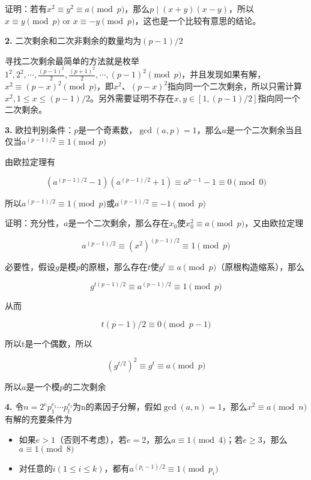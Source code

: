 \documentclass{article}
\begin{document}
证明：若有$x^2\equiv y^2\equiv a\pmod{p}$，那么$p\mid (x+y)(x-y)$，所以$x\equiv y\pmod{p}$ or $x\equiv -y\pmod{p}$，这也是一个比较有意思的结论。

\textbf{2.} 二次剩余和二次非剩余的数量均为$(p-1)/2$

寻找二次剩余最简单的方法就是枚举$1^2,2^2,\cdots,\frac{(p-1)^2}{2},\frac{(p+1)^2}{2},\cdots,(p-1)^2\pmod{p}$，并且发现如果有解，$x^2\equiv (p-x)^2\pmod{p}$，即$x^2、(p-x)^2$指向同一个二次剩余，所以只需计算$x^2,1\le x\le (p-1)/2$。另外需要证明不存在$x,y\in[1,(p-1)/2]$指向同一个二次剩余。

\textbf{3.} 欧拉判别条件：$p$是一个奇素数，$\gcd(a,p)=1$，那么$a$是一个二次剩余当且仅当$a^{(p-1)/2}\equiv 1\pmod{p}$

由欧拉定理有

\begin{equation}
    (a^{(p-1)/2}-1)(a^{(p-1)/2}+1)\equiv a^{p-1} - 1\equiv 0 \pmod{0}
\end{equation}

所以$a^{(p-1)/2}\equiv 1\pmod{p}$或$a^{(p-1)/2}\equiv -1\pmod{p}$

证明：充分性，$a$是一个二次剩余，那么存在$x_0$使$x_0^2\equiv a\pmod{p}$，又由欧拉定理

\begin{equation}
    a^{(p-1)/2}\equiv (x^2)^{(p-1)/2}\equiv 1\pmod{p}
\end{equation}

必要性，假设$g$是模$p$的原根，那么存在$t$使$g^t\equiv a\pmod{p}$（原根构造缩系），那么

\begin{equation}
    g^{t(p-1)/2}\equiv a^{(p-1)/2}\equiv 1\pmod{p}
    \nonumber
\end{equation}

从而

\begin{equation}
    t(p-1)/2\equiv 0\pmod{p-1}
\end{equation}

所以t是一个偶数，所以

\begin{equation}
    (g^{t/2})^2\equiv g^t\equiv a\pmod{p}
\end{equation}

所以$a$是一个模$p$的二次剩余

\textbf{4.} 令$n=2^ep_1^{e_1}\cdots p_l^{e_l}$为n的素因子分解，假如$\gcd(a,n)=1$，那么$x^2\equiv a\pmod{n}$有解的充要条件为

\begin{itemize}
    \item 如果$e>1$（否则不考虑），若$e=2$，那么$a\equiv 1\pmod{4}$；若$e\ge 3$，那么$a\equiv 1\pmod{8}$
    \item 对任意的$i (1\le i\le k)$，都有$a^{(p_i-1)/2}\equiv 1\pmod{p_i}$
\end{itemize}
\end{document}
